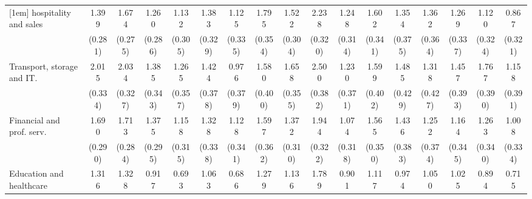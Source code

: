 {\begin{tabular}{l*{16}{c}}
[1em]
hospitality and sales&       1.399\sym{***}&       1.674\sym{***}&       1.260\sym{***}&       1.132\sym{***}&       1.383\sym{***}&       1.125\sym{***}&       1.795\sym{***}&       1.522\sym{***}&       2.238\sym{***}&       1.248\sym{***}&       1.602\sym{***}&       1.354\sym{***}&       1.362\sym{***}&       1.269\sym{***}&       1.120\sym{***}&       0.867\sym{**} \\
                    &     (0.281)         &     (0.275)         &     (0.286)         &     (0.305)         &     (0.329)         &     (0.335)         &     (0.354)         &     (0.304)         &     (0.320)         &     (0.314)         &     (0.341)         &     (0.375)         &     (0.364)         &     (0.337)         &     (0.324)         &     (0.321)         \\
[1em]
Transport, storage and IT.&       2.015\sym{***}&       2.034\sym{***}&       1.385\sym{***}&       1.265\sym{***}&       1.424\sym{***}&       0.976\sym{**} &       1.580\sym{***}&       1.658\sym{***}&       2.500\sym{***}&       1.230\sym{***}&       1.599\sym{***}&       1.485\sym{***}&       1.318\sym{**} &       1.457\sym{***}&       1.767\sym{***}&       1.158\sym{**} \\
                    &     (0.334)         &     (0.327)         &     (0.343)         &     (0.357)         &     (0.378)         &     (0.379)         &     (0.400)         &     (0.355)         &     (0.382)         &     (0.371)         &     (0.402)         &     (0.429)         &     (0.427)         &     (0.393)         &     (0.390)         &     (0.391)         \\
[1em]
Financial and prof. serv.&       1.690\sym{***}&       1.713\sym{***}&       1.375\sym{***}&       1.158\sym{***}&       1.328\sym{***}&       1.128\sym{***}&       1.597\sym{***}&       1.372\sym{***}&       1.944\sym{***}&       1.074\sym{***}&       1.565\sym{***}&       1.436\sym{***}&       1.252\sym{***}&       1.164\sym{***}&       1.263\sym{***}&       1.008\sym{**} \\
                    &     (0.290)         &     (0.284)         &     (0.295)         &     (0.315)         &     (0.338)         &     (0.341)         &     (0.362)         &     (0.310)         &     (0.322)         &     (0.318)         &     (0.350)         &     (0.383)         &     (0.374)         &     (0.345)         &     (0.340)         &     (0.334)         \\
[1em]
Education and healthcare&       1.316\sym{***}&       1.328\sym{***}&       0.917\sym{**} &       0.693\sym{*}  &       1.063\sym{**} &       0.686\sym{*}  &       1.279\sym{***}&       1.136\sym{***}&       1.789\sym{***}&       0.901\sym{**} &       1.117\sym{**} &       0.974\sym{*}  &       1.050\sym{**} &       1.025\sym{**} &       0.894\sym{**} &       0.715\sym{*}  \\

\end{tabular}}
